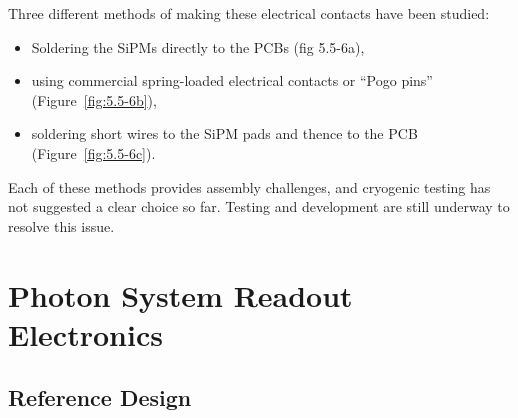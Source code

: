 Three different methods of making these electrical contacts have been studied:
\begin{itemize}
\item Soldering
the SiPMs directly to the PCBs (fig 5.5-6a), 
\item using commercial
spring-loaded electrical contacts or ``Pogo pins'' (Figure~\ref{fig:5.5-6b}), 
\item soldering short wires to the SiPM pads and thence to the PCB
(Figure~\ref{fig:5.5-6c}).  
\end{itemize}
Each of these methods provides assembly challenges,
and cryogenic testing has not suggested a clear choice so far.
Testing and development are still underway to resolve this issue.

\section{Photon System Readout Electronics}
\label{sec_elec}

\subsection{Reference Design} %

